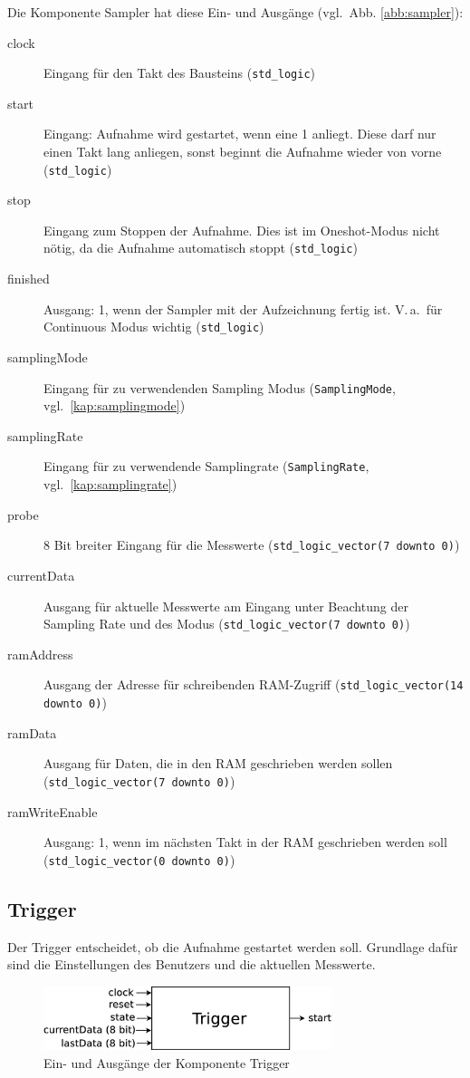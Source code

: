 \documentclass[IN,ngerman,utf8,12pt]{tumbook}
\newcommand{\vgl}{vgl.\ }
\newcommand{\Va}{V.\,a.\ }
\begin{document}
Die Komponente Sampler hat diese Ein- und Ausgänge (\vgl Abb. \ref{abb:sampler}):
\begin{description}
    \item[clock] Eingang für den Takt des Bausteins (\texttt{std\_logic})
    \item[start] Eingang: Aufnahme wird gestartet, wenn eine 1 anliegt. Diese darf nur einen Takt lang anliegen, sonst beginnt die Aufnahme wieder von vorne (\texttt{std\_logic})
    \item[stop] Eingang zum Stoppen der Aufnahme. Dies ist im Oneshot-Modus nicht nötig, da die Aufnahme automatisch stoppt (\texttt{std\_logic})
    \item[finished] Ausgang: 1, wenn der Sampler mit der Aufzeichnung fertig ist. \Va für Continuous Modus wichtig (\texttt{std\_logic})
    \item[samplingMode] Eingang für zu verwendenden Sampling Modus (\texttt{SamplingMode}, \vgl \ref{kap:samplingmode})
    \item[samplingRate] Eingang für zu verwendende Samplingrate (\texttt{SamplingRate}, \vgl \ref{kap:samplingrate})
    \item[probe] 8 Bit breiter Eingang für die Messwerte (\texttt{std\_logic\_vector(7 downto 0)})
    \item[currentData] Ausgang für aktuelle Messwerte am Eingang unter Beachtung der Sampling Rate und des Modus (\texttt{std\_logic\_vector(7 downto 0)})
    \item[ramAddress] Ausgang der Adresse für schreibenden RAM-Zugriff (\texttt{std\_logic\_vector(14 downto 0)})
    \item[ramData] Ausgang für Daten, die in den RAM geschrieben werden sollen (\texttt{std\_logic\_vector(7 downto 0)})
    \item[ramWriteEnable] Ausgang: 1, wenn im nächsten Takt in der RAM geschrieben werden soll (\texttt{std\_logic\_vector(0 downto 0)})
\end{description}

\subsection{Trigger}

Der Trigger entscheidet, ob die Aufnahme gestartet werden soll.
Grundlage dafür sind die Einstellungen des Benutzers und die aktuellen Messwerte.

\begin{figure}[H]
    \centerline{
        \includegraphics[width=0.75\textwidth]{img/trigger}
    }
    \label{abb:trigger}
    \caption{Ein- und Ausgänge der Komponente Trigger}
\end{figure}
\end{document}
